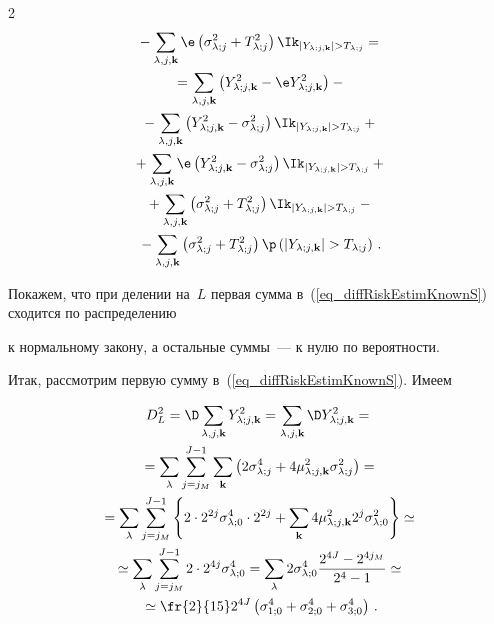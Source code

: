 \begin{multicols}{2}
\begin{multline}
{}- \sumljk\e\left(\slj+\Tlj^2\right)\indYjkgTj ={}\\


{}= \sumljk\left(\Yljk^2-\e\Yljk^2\right) -{}\\


{}- \sumljk\left(\Yljk^2-\slj\right)\indYjkgTj + {}\\


{}+ \sumljk\e\left(\Yljk^2-\slj\right)\indYjkgTj +{}\\


{}+ \sumljk\left(\slj+\Tlj^2\right)\indYjkgTj -{}\\


{}- \sumljk\left(\slj+\Tlj^2\right)\prbYjkgTj\,.


\label{eq_diffRiskEstimKnownS}


\end{multline}


Покажем, что при делении на~$L$ первая сумма в~(\ref{eq_diffRiskEstimKnownS}) сходится по распределению


к нормальному закону, а остальные суммы~--- к нулю по вероятности.





Итак, рассмотрим первую сумму в~(\ref{eq_diffRiskEstimKnownS}). Имеем


\begin{multline}


D_L^2 = \D\sumljk\Yljk^2 = \sumljk \D \Yljk^2={}\\


{}=\sum\limits_\lambda \sum_{j=j_M}^{J-1} \sum_{\mathbf{k}}


\left( 2\solj^4 + 4\muljk^2\slj \right)={}\\


{}= \sum\limits_\lambda \sum_{j=j_M}^{J-1}\left\{ 2\cdot 2^{2j}


\solz^4 \cdot 2^{2j} + \sum_{\mathbf{k}}4\muljk^2 2^j \solz^2 \right\} \simeq{}\\


{}\simeq \sum\limits_\lambda \sum_{j=j_M}^{J-1} 2\cdot 2^{4j}


\solz^4 = \sum\limits_\lambda 2\solz^4 \frac{2^{4J} - 2^{4j_M}}{2^4 - 1} \simeq{}\\


{}\simeq \fr{2}{15} 2^{4J} \left( \silz^4 + \siilz^4 + \siiilz^4 \right)\,.


\label{eq_DLknownS}


\end{multline}



\end{multicols}
